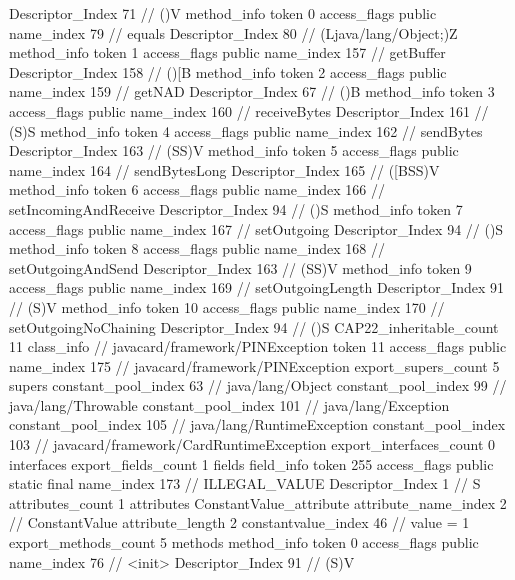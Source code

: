 {{{{{					Descriptor_Index	71		// ()V
				}
				method_info {
					token	0
					access_flags	public
					name_index	79		// equals
					Descriptor_Index	80		// (Ljava/lang/Object;)Z
				}
				method_info {
					token	1
					access_flags	public
					name_index	157		// getBuffer
					Descriptor_Index	158		// ()[B
				}
				method_info {
					token	2
					access_flags	public
					name_index	159		// getNAD
					Descriptor_Index	67		// ()B
				}
				method_info {
					token	3
					access_flags	public
					name_index	160		// receiveBytes
					Descriptor_Index	161		// (S)S
				}
				method_info {
					token	4
					access_flags	public
					name_index	162		// sendBytes
					Descriptor_Index	163		// (SS)V
				}
				method_info {
					token	5
					access_flags	public
					name_index	164		// sendBytesLong
					Descriptor_Index	165		// ([BSS)V
				}
				method_info {
					token	6
					access_flags	public
					name_index	166		// setIncomingAndReceive
					Descriptor_Index	94		// ()S
				}
				method_info {
					token	7
					access_flags	public
					name_index	167		// setOutgoing
					Descriptor_Index	94		// ()S
				}
				method_info {
					token	8
					access_flags	public
					name_index	168		// setOutgoingAndSend
					Descriptor_Index	163		// (SS)V
				}
				method_info {
					token	9
					access_flags	public
					name_index	169		// setOutgoingLength
					Descriptor_Index	91		// (S)V
				}
				method_info {
					token	10
					access_flags	public
					name_index	170		// setOutgoingNoChaining
					Descriptor_Index	94		// ()S
				}
			}
			CAP22_inheritable_count	11
		}
		class_info {		// javacard/framework/PINException
			token	11
			access_flags	public
			name_index	175		// javacard/framework/PINException
			export_supers_count	5
			supers {
				constant_pool_index	63		// java/lang/Object
				constant_pool_index	99		// java/lang/Throwable
				constant_pool_index	101		// java/lang/Exception
				constant_pool_index	105		// java/lang/RuntimeException
				constant_pool_index	103		// javacard/framework/CardRuntimeException
			}
			export_interfaces_count	0
			interfaces {
			}
			export_fields_count	1
			fields {
			field_info {
				token	255
				access_flags	public static final
				name_index	173		// ILLEGAL_VALUE
				Descriptor_Index	1		// S
				attributes_count	1
				attributes {
				ConstantValue_attribute {
					attribute_name_index	2		// ConstantValue
					attribute_length	2
					constantvalue_index	46		// value = 1
				}
				}
			}
			}
			export_methods_count	5
			methods {
				method_info {
					token	0
					access_flags	public
					name_index	76		// <init>
					Descriptor_Index	91		// (S)V
}}}}}
